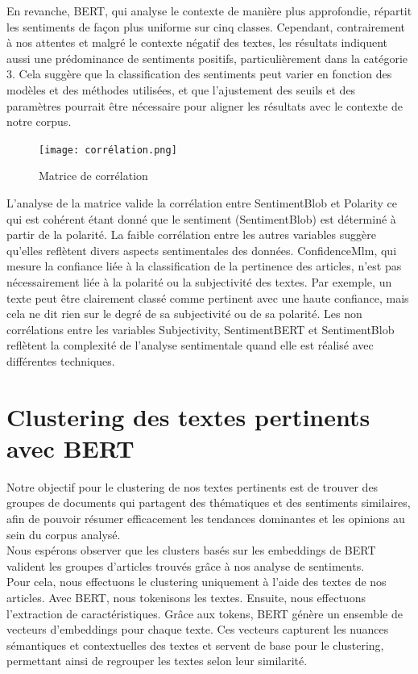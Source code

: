 \documentclass{article}
\begin{document}
En revanche, BERT, qui analyse le contexte de manière plus approfondie, répartit les sentiments de façon plus uniforme sur cinq classes. Cependant, contrairement à nos attentes et malgré le contexte négatif des textes, les résultats indiquent aussi une prédominance de sentiments positifs, particulièrement dans la catégorie 3. Cela suggère que la classification des sentiments peut varier en fonction des modèles et des méthodes utilisées, et que l'ajustement des seuils et des paramètres pourrait être nécessaire pour aligner les résultats avec le contexte de notre corpus.

\begin{figure}[!htbp]
    \centering
    \texttt{[image: corrélation.png]}
    \caption{Matrice de corrélation}
    \label{fig:plots}
\end{figure}

L'analyse de la matrice valide la corrélation entre SentimentBlob et Polarity ce qui est cohérent étant donné que le sentiment (SentimentBlob) est déterminé à partir de la polarité. La faible corrélation entre les autres variables suggère qu'elles reflètent divers aspects sentimentales des données. ConfidenceMlm, qui mesure la confiance liée à la classification de la pertinence des articles, n'est pas nécessairement liée à la polarité ou la subjectivité des textes. Par exemple, un texte peut être clairement classé comme pertinent avec une haute confiance, mais cela ne dit rien sur le degré de sa subjectivité ou de sa polarité. Les non corrélations entre les variables Subjectivity, SentimentBERT et SentimentBlob reflètent la complexité de l'analyse sentimentale quand elle est réalisé avec différentes techniques. 

\section{Clustering des textes pertinents avec BERT}

Notre objectif pour le clustering de nos textes pertinents est de trouver des groupes de documents qui partagent des thématiques et des sentiments similaires, afin de pouvoir résumer efficacement les tendances dominantes et les opinions au sein du corpus analysé. \\

Nous espérons observer que les clusters basés sur les embeddings de BERT 
valident les groupes d'articles trouvés grâce à nos analyse de sentiments. \\

Pour cela, nous effectuons le clustering uniquement à l'aide des textes de nos articles. Avec BERT, nous tokenisons les textes. Ensuite, nous effectuons l'extraction de caractéristiques. Grâce aux tokens, BERT génère un ensemble de vecteurs d'embeddings pour chaque texte. Ces vecteurs capturent les nuances sémantiques et contextuelles des textes et servent de base pour le clustering, permettant ainsi de regrouper les textes selon leur similarité. \\
\end{document}
